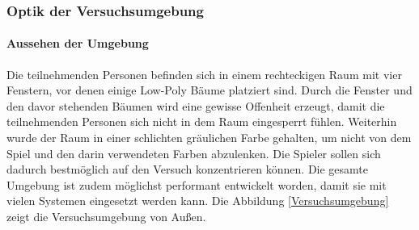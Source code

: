 \documentclass[a4paper,11pt]{article}%
\renewcommand{\\}{\vspace*{0.5\baselineskip} \newline}
\begin{document}
\newpage	
\subsubsection{Optik der Versuchsumgebung}
\paragraph{Aussehen der Umgebung}
Die teilnehmenden Personen befinden sich in einem rechteckigen Raum mit vier Fenstern, vor denen einige Low-Poly Bäume platziert sind. Durch die Fenster und den davor stehenden Bäumen wird eine gewisse Offenheit erzeugt, damit die teilnehmenden Personen sich nicht in dem Raum eingesperrt fühlen. Weiterhin wurde der Raum in einer schlichten gräulichen Farbe gehalten, um nicht von dem Spiel und den darin verwendeten Farben abzulenken. Die Spieler sollen sich dadurch bestmöglich auf den Versuch konzentrieren können. Die gesamte Umgebung ist zudem möglichst performant entwickelt worden, damit sie mit vielen Systemen eingesetzt werden kann. Die Abbildung \ref{Versuchsumgebung} zeigt die Versuchsumgebung von Außen.
\end{document}
